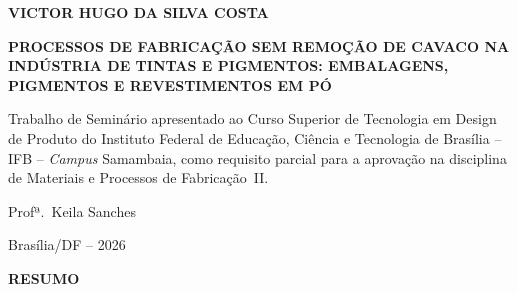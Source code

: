 \documentclass[
  12pt,
  a4paper,
  oneside,
  brazil,
  chapter=TITLE
]{article}
\begin{document}
\begin{titlepage}
  \thispagestyle{empty}
  \begin{center}

    {\normalsize\bfseries VICTOR HUGO DA SILVA COSTA}

    \vfill

    {\large\bfseries
      PROCESSOS DE FABRICAÇÃO SEM REMOÇÃO DE CAVACO NA INDÚSTRIA DE TINTAS
      E PIGMENTOS: EMBALAGENS, PIGMENTOS E REVESTIMENTOS EM PÓ
    }

    \vfill

    \begin{flushright}
      \begin{minipage}{0.5\textwidth}
        \normalsize
        Trabalho de Seminário apresentado ao Curso Superior de Tecnologia em
        Design de Produto do Instituto Federal de Educação, Ciência e
        Tecnologia de Brasília -- IFB -- \textit{Campus} Samambaia, como
        requisito parcial para a aprovação na disciplina de Materiais e
        Processos de Fabricação~II.

        \vspace{1em}
        Profª.\ Keila Sanches
      \end{minipage}
    \end{flushright}

    \vfill

    {\normalsize Brasília/DF -- 2026}

  \end{center}
\end{titlepage}

\clearpage
\thispagestyle{empty}
\begin{center}
  {\normalsize\bfseries RESUMO}
\end{center}
\end{document}
